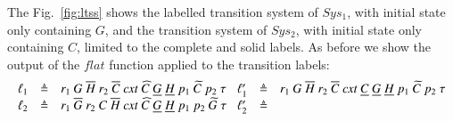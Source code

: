 The Fig.~\ref{fig:ltss} shows the labelled transition system of $Sys_1$, with initial state only  containing  $G$,  and the transition system of $Sys_2$, with initial state only containing $C$, limited to the complete
and solid labels. As before we show the output of the $flat$ function applied to the transition labels:
{\tiny \[
\begin{array}{lcl@{\hspace{0.3cm}} lcl}
\ell_1 &\defeq & 
r_1~G~\overline{H}~r_2~\overline{C}~\mathit{cxt}~\widehat{C}~\underline{G}~\underline{H}~p_1~\widetilde{C}~p_2~\silent
&
\ell'_1 &\defeq & 
r_1~G~\overline{H}~r_2~\overline{C}~\mathit{cxt}~\underline{C}~\underline{G}~\underline{H}~p_1~\widetilde{C}~p_2~\silent\\
\ell_2 &\defeq &
r_1~\overline{G}~r_2~C~\overline{H}~\mathit{cxt}~\widehat{C}~\underline{G}~\underline{H}~p_1~p_2~\widetilde{G}~\silent
&
\ell'_2 &\defeq & 

\end{array}\]}
